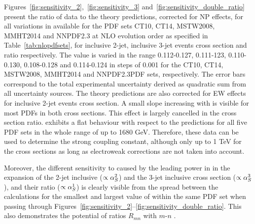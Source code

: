 Figures~\ref{fig:sensitivity_2},~\ref{fig:sensitivity_3} and~\ref{fig:sensitivity_double_ratio} present the ratio of data to the theory predictions, corrected for NP effects, for all variations in \alpsmz available for the PDF sets CT10, CT14, MSTW2008, MMHT2014 and NNPDF2.3 at NLO evolution order as specified in Table~\ref{tab:nlopdfsets}, for inclusive 2-jet, inclusive 3-jet events cross section and ratio \ratio respectively. The \alpsmz value is varied in the range 0.112-0.127, 0.111-123, 0.110-0.130, 0.108-0.128 and 0.114-0.124 in steps of 0.001 for the CT10, CT14, MSTW2008, MMHT2014 and NNPDF2.3PDF sets, respectively. The error bars correspond to the total experimental uncertainty derived as quadratic sum from all uncertainty sources. The theory predictions are also corrected for EW effects for inclusive 2-jet events cross section. A small slope increasing with \httwo is visible for most PDFs in both cross sections. This effect is largely cancelled in the cross section ratio. \ratio exhibits a flat behaviour with respect to the predictions for all five PDF sets in the whole range of \httwo up to 1680 GeV. Therefore, these data can be used to determine the strong coupling constant, although only up to 1 TeV for the cross sections as long as electroweak corrections are not taken into account.

Moreover, the different sensitivity to \alpsmz caused by the leading power in \alps in the expansion of the 2-jet inclusive ($\propto\alpha_S^2$) and the 3-jet inclusive cross section ($\propto\alpha_S^3$), and their ratio ($\propto\alpha_S^1$) is clearly visible from the spread between the calculations for the smallest and largest value of \alpsmz within the same PDF set when passing through Figures~\ref{fig:sensitivity_2}--\ref{fig:sensitivity_double_ratio}.  This also demonstrates the potential of ratios $R_{mn}$ with $m$-$n$ .

